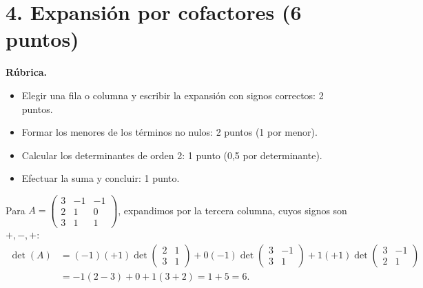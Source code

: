 \documentclass[10pt,a4]{examenEPN0}
\begin{document}
\newpage
\section*{4. Expansión por cofactores (6 puntos)}
\noindent\textbf{Rúbrica.}
\begin{itemize}[itemsep=2pt]
    \item Elegir una fila o columna y escribir la expansión con signos correctos: 2 puntos.
    \item Formar los menores de los términos no nulos: 2 puntos (1 por menor).
    \item Calcular los determinantes de orden 2: 1 punto (0,5 por determinante).
    \item Efectuar la suma y concluir: 1 punto.
\end{itemize}
Para $A=\begin{pmatrix}3&-1&-1\\2&1&0\\3&1&1\end{pmatrix}$,
expandimos por la tercera columna, cuyos signos son $+,-,+$:
\begin{align*}
    \det(A)&=(-1)(+1)\det\begin{pmatrix}2&1\\3&1\end{pmatrix}
        +0(-1)\det\begin{pmatrix}3&-1\\3&1\end{pmatrix}
        +1(+1)\det\begin{pmatrix}3&-1\\2&1\end{pmatrix}\\
    &=-1(2-3)+0+1(3+2)=1+5=\boxed{6}.
\end{align*}
\end{document}
